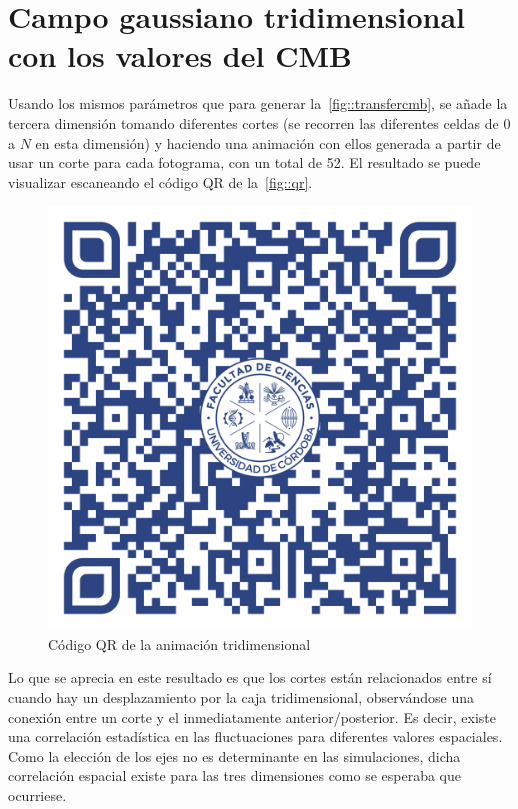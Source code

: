 \section{Campo gaussiano tridimensional con los valores del CMB}
Usando los mismos parámetros que para generar la~\autoref{fig::transfercmb}, se añade la tercera dimensión tomando diferentes cortes (se recorren las diferentes celdas de 0 a \(N\) en esta dimensión) y haciendo una animación con ellos generada a partir de usar un corte para cada fotograma, con un total de 52. El resultado se puede visualizar escaneando el código QR de la~\autoref{fig::qr}.
\begin{figure}[h]
    \centering
    \includegraphics[scale=.075]{svg/qrgif.pdf}
    \caption{Código QR de la animación tridimensional}
    \label{fig::qr}
\end{figure}

Lo que se aprecia en este resultado es que los cortes están relacionados entre sí cuando hay un desplazamiento por la caja tridimensional, observándose una conexión entre un corte y el inmediatamente anterior/posterior. Es decir, existe una correlación estadística en las fluctuaciones para diferentes valores espaciales. Como la elección de los ejes no es determinante en las simulaciones, dicha correlación espacial existe para las tres dimensiones como se esperaba que ocurriese.